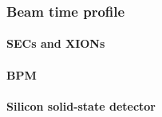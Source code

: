 \subsubsection{Beam time profile}
    \paragraph{SECs and XIONs}
    
    \paragraph{BPM}
    
    \paragraph{Silicon solid-state detector}